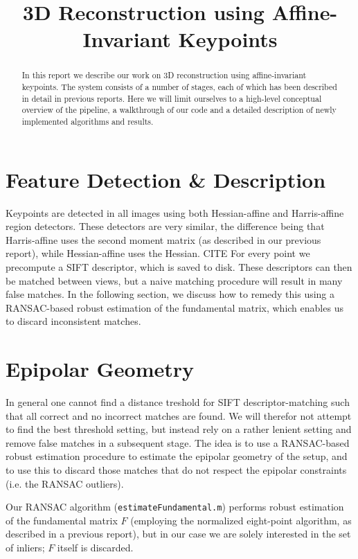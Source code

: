 \documentclass[a4paper,10pt]{article}
\title{3D Reconstruction using Affine-Invariant Keypoints}
\author{}
\begin{document}
\maketitle

\begin{abstract}
In this report we describe our work on 3D reconstruction using affine-invariant keypoints.
The system consists of a number of stages, each of which has been described in detail in previous reports.
Here we will limit ourselves to a high-level conceptual overview of the pipeline, a walkthrough of our code and a detailed description of newly implemented algorithms and results.

\end{abstract}

\section{Feature Detection \& Description}
Keypoints are detected in all images using both Hessian-affine and Harris-affine region detectors.
These detectors are very similar, the difference being that Harris-affine uses the second moment matrix (as described in our previous report), while Hessian-affine uses the Hessian. CITE
For every point we precompute a SIFT descriptor, which is saved to disk.
These descriptors can then be matched between views, but a naive matching procedure will result in many false matches.
In the following section, we discuss how to remedy this using a RANSAC-based robust estimation of the fundamental matrix, which enables us to discard inconsistent matches.

\section{Epipolar Geometry}

In general one cannot find a distance treshold for SIFT descriptor-matching such that all correct and no incorrect matches are found.
We will therefor not attempt to find the best threshold setting, but instead rely on a rather lenient setting and remove false matches in a subsequent stage.
The idea is to use a RANSAC-based robust estimation procedure to estimate the epipolar geometry of the setup, and to use this to discard those matches that do not respect the epipolar constraints (i.e. the RANSAC outliers).

Our RANSAC algorithm (\verb+estimateFundamental.m+) performs robust estimation of the fundamental matrix $F$ (employing the normalized eight-point algorithm, as described in a previous report), but in our case we are solely interested in the set of inliers; $F$ itself is discarded.
\end{document}
